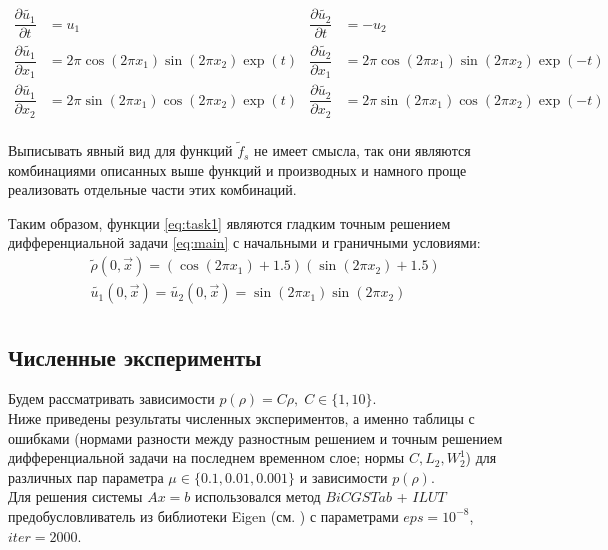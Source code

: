 \begin{align*}
    \dfrac{\partial \tilde{u_1}}{\partial t}
          &= u_1
  & \dfrac{\partial \tilde{u_2}}{\partial t}
          &= -u_2 \\
    \dfrac{\partial \tilde{u_1}}{\partial x_1}
          &= 2 \pi \cos (2 \pi x_1) \sin(2 \pi x_2) \exp (t)
  & \dfrac{\partial \tilde{u_2}}{\partial x_1}
          &= 2 \pi \cos (2 \pi x_1) \sin(2 \pi x_2) \exp (-t) \\
    \dfrac{\partial \tilde{u_1}}{\partial x_2}
          &= 2 \pi \sin (2 \pi x_1) \cos(2 \pi x_2) \exp (t)
  & \dfrac{\partial \tilde{u_2}}{\partial x_2}
          &= 2 \pi \sin (2 \pi x_1) \cos(2 \pi x_2) \exp (-t) \\
\end{align*}

Выписывать явный вид для функций $\widetilde{f}_s$ не имеет смысла, так они являются комбинациями описанных выше функций и производных и намного проще реализовать отдельные части этих комбинаций.

Таким образом, функции \eqref{eq:task1} являются гладким точным решением дифференциальной задачи  \eqref{eq:main} с начальными и граничными условиями:
\begin{equation*}
\begin{aligned}
  & \tilde{\rho}(0, \vec{x}) = (\cos (2 \pi x_1) + 1.5) (\sin (2 \pi x_2) + 1.5) \\
  & \tilde{u_1}(0, \vec{x}) = \tilde{u_2}(0, \vec{x}) = \sin (2 \pi x_1) \sin (2 \pi x_2) \\
\end{aligned}
\end{equation*}



\subsection{Численные эксперименты}
Будем рассматривать зависимости $ p(\rho) = C \rho, \; C \in \{1, 10\} $. \\

Ниже приведены результаты численных экспериментов, а именно таблицы с ошибками (нормами разности между разностным решением и точным решением дифференциальной задачи на последнем временном слое; нормы $C, L_{2}, W_{2}^{1}$) для различных пар параметра $\mu \in \{0.1, 0.01, 0.001\}$ и зависимости $p(\rho)$. \\

Для решения системы $Ax = b$ использовался метод $BiCGSTab$ + $ILUT$ предобусловливатель из библиотеки Eigen (см. \cite{Eigen}) с параметрами $eps = 10^{-8}$, $iter = 2000$.


